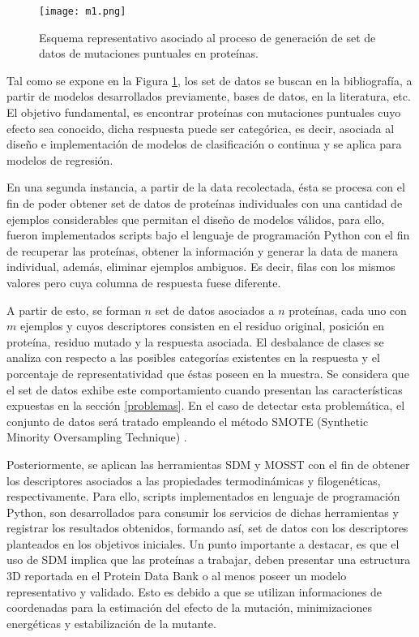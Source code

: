\begin{figure}[!h]
	\centering
	\texttt{[image: m1.png]}
	\caption{Esquema representativo asociado al proceso de generación de set de datos de mutaciones puntuales en proteínas.}
	\label{C2:M1}
\end{figure}

Tal como se expone en la Figura \ref{C2:M1}, los set de datos se buscan en la bibliografía, a partir de modelos desarrollados previamente, bases de datos, en la literatura, etc. El objetivo fundamental, es encontrar proteínas con mutaciones puntuales cuyo efecto sea conocido, dicha respuesta puede ser categórica, es decir, asociada al diseño e implementación de modelos de clasificación o continua y se aplica para modelos de regresión. 

En una segunda instancia, a partir de la data recolectada, ésta se procesa con el fin de poder obtener set de datos de proteínas individuales con una cantidad de ejemplos considerables que permitan el diseño de modelos válidos, para ello, fueron implementados scripts bajo el lenguaje de programación Python con el fin de recuperar las proteínas, obtener la información y generar la data de manera individual, además, eliminar ejemplos ambiguos. Es decir, filas con los mismos valores pero cuya columna de respuesta fuese diferente. 

A partir de esto, se forman $n$ set de datos asociados a $n$ proteínas, cada uno con $m$ ejemplos y cuyos descriptores consisten en el residuo original, posición en proteína, residuo mutado y la respuesta asociada. El desbalance de clases se analiza con respecto a las posibles categorías existentes en la respuesta y el porcentaje de representatividad que éstas poseen en la muestra. Se considera que el set de datos exhibe este comportamiento cuando presentan las características expuestas en la sección \ref{problemas}. En el caso de detectar esta problemática, el conjunto de datos será tratado empleando el método SMOTE (Synthetic Minority Oversampling Technique) \cite{chawla2002smote}.

Posteriormente, se aplican las herramientas SDM \cite{Pandurangan2017} y MOSST \cite{Olivera-Nappa2011} con el fin de obtener los descriptores asociados a las propiedades termodinámicas y filogenéticas, respectivamente. Para ello, scripts implementados en lenguaje de programación Python, son desarrollados para consumir los servicios de dichas herramientas y registrar los resultados obtenidos, formando así, set de datos con los descriptores planteados en los objetivos iniciales. Un punto importante a destacar, es que el uso de SDM implica que las proteínas a trabajar, deben presentar una estructura 3D reportada en el Protein Data Bank \cite{berman2000protein} o al menos poseer un modelo representativo y validado. Esto es debido a que se utilizan informaciones de coordenadas para la estimación del efecto de la mutación, minimizaciones energéticas y estabilización de la mutante.

